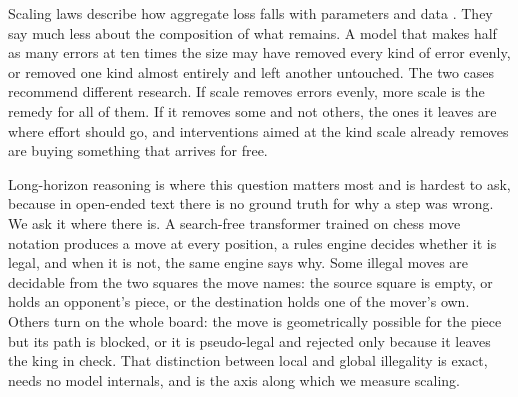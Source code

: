 \documentclass[11pt]{article}
\begin{document}
Scaling laws describe how aggregate loss falls with parameters and data
\citep{kaplan2020scaling,hoffmann2022training}. They say much less about the
composition of what remains. A model that makes half as many errors at ten times
the size may have removed every kind of error evenly, or removed one kind almost
entirely and left another untouched. The two cases recommend different research.
If scale removes errors evenly, more scale is the remedy for all of them. If it
removes some and not others, the ones it leaves are where effort should go, and
interventions aimed at the kind scale already removes are buying something that
arrives for free.

Long-horizon reasoning is where this question matters most and is hardest to ask,
because in open-ended text there is no ground truth for why a step was wrong. We
ask it where there is. A search-free transformer trained on chess move notation
produces a move at every position, a rules engine decides whether it is legal,
and when it is not, the same engine says why. Some illegal moves are decidable
from the two squares the move names: the source square is empty, or holds an
opponent's piece, or the destination holds one of the mover's own. Others turn on
the whole board: the move is geometrically possible for the piece but its path is
blocked, or it is pseudo-legal and rejected only because it leaves the king in
check. That distinction between local and global illegality is exact, needs no
model internals, and is the axis along which we measure scaling.
\end{document}
